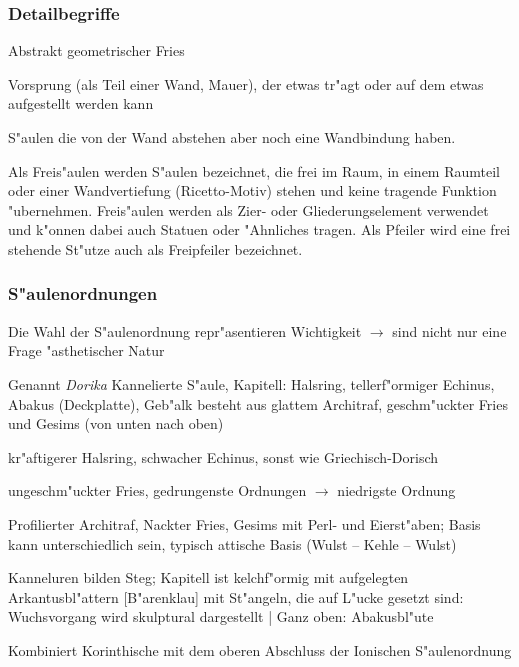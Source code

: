 \documentclass[emulatestandardclasses]{scrartcl}
\begin{document}
\subsubsection{Detailbegriffe}

\begin{description}[leftmargin=!,labelwidth=\widthof{\bfseries Zahnschnitt}]
  \item[Zahnschnitt] Abstrakt geometrischer Fries
  \item[Konsole] Vorsprung (als Teil einer Wand, Mauer), der etwas tr"agt oder auf dem etwas aufgestellt werden kann
  \item[Vorlage] S"aulen die von der Wand abstehen aber noch eine Wandbindung haben.
  \item[Freis"aule] Als Freis"aulen werden S"aulen bezeichnet, die frei im Raum, in einem Raumteil oder einer Wandvertiefung (Ricetto-Motiv) stehen und keine tragende Funktion "ubernehmen. Freis"aulen werden als Zier- oder Gliederungselement verwendet und k"onnen dabei auch Statuen oder "Ahnliches tragen. Als Pfeiler wird eine frei stehende St"utze auch als Freipfeiler bezeichnet.
\end{description}

\subsubsection{S"aulenordnungen}

Die Wahl der S"aulenordnung repr"asentieren Wichtigkeit $\rightarrow$ sind nicht nur eine Frage "asthetischer Natur\\

\begin{description}[leftmargin=!,labelwidth=\widthof{\bfseries Griechisch-Dorisch}]
  \item[Griechisch-Dorisch] Genannt \emph{Dorika} Kannelierte S"aule, Kapitell: Halsring, tellerf"ormiger Echinus, Abakus (Deckplatte), Geb"alk besteht aus glattem Architraf, geschm"uckter Fries und Gesims (von unten nach oben) 
  \item[R"omisch-Dorisch] kr"aftigerer Halsring, schwacher Echinus, sonst wie Griechisch-Dorisch
  \item[Toskanisch] ungeschm"uckter Fries, gedrungenste Ordnungen $\rightarrow$ niedrigste Ordnung
  \item[Ionisch] Profilierter Architraf, Nackter Fries, Gesims mit Perl- und Eierst"aben; Basis kann unterschiedlich sein, typisch attische Basis (Wulst -- Kehle -- Wulst)
  \item[Korinthisch] Kanneluren bilden Steg; Kapitell ist kelchf"ormig mit aufgelegten Arkantusbl"attern [B"arenklau] mit St"angeln, die auf L"ucke gesetzt sind: Wuchsvorgang wird skulptural dargestellt | Ganz oben: Abakusbl"ute
  \item[Komposit] Kombiniert Korinthische mit dem oberen Abschluss der Ionischen S"aulenordnung

\end{description}
\end{document}
